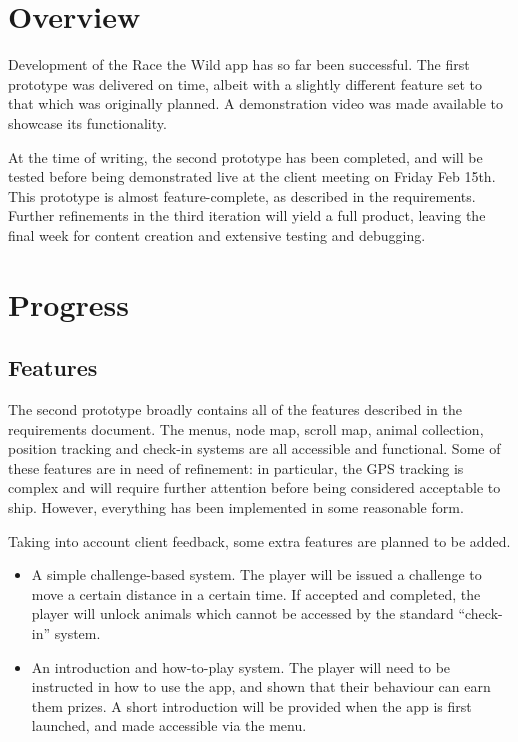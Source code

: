 \documentclass[12pt,a4paper,twoside]{article}
\begin{document}

\newpage
\pagestyle{empty}
\cleardoublepage                             %
\newpage

\section{Overview}

Development of the Race the Wild app has so far been successful. 
The first prototype was delivered on time, albeit with a slightly different feature set to that which was originally planned.
A demonstration video was made available to showcase its functionality. 

At the time of writing, the second prototype has been completed, and will be tested before being demonstrated live at the client meeting on Friday Feb 15th. 
This prototype is almost feature-complete, as described in the requirements. 
Further refinements in the third iteration will yield a full product, leaving the final week for content creation and extensive testing and debugging.

\section{Progress}

\subsection{Features}

The second prototype broadly contains all of the features described in the requirements document. 
The menus, node map, scroll map, animal collection, position tracking and check-in systems are all accessible and functional. 
Some of these features are in need of refinement: in particular, the GPS tracking is complex and will require further attention before being considered acceptable to ship. 
However, everything has been implemented in some reasonable form.

Taking into account client feedback, some extra features are planned to be added.
\begin{itemize}
\item A simple challenge-based system. 
The player will be issued a challenge to move a certain distance in a certain time. 
If accepted and completed, the player will unlock animals which cannot be accessed by the standard ``check-in'' system.
\item An introduction and how-to-play system. 
The player will need to be instructed in how to use the app, and shown that their behaviour can earn them prizes. 
A short introduction will be provided when the app is first launched, and made accessible via the menu.
\end{itemize}
\end{document}
